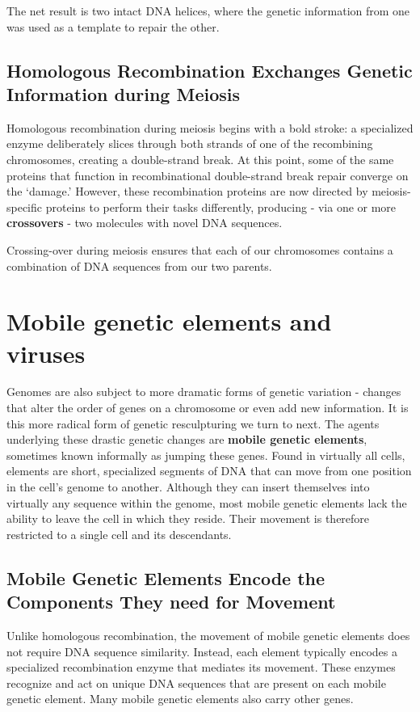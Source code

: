 The net result is two intact DNA
helices, where the genetic information from one was used as a template
to repair the other.

\subsection{Homologous Recombination Exchanges Genetic Information during Meiosis}

Homologous recombination during meiosis begins with a bold stroke:
a specialized enzyme deliberately slices through both strands of one
of the recombining chromosomes, creating a double-strand break. At
this point, some of the same proteins that function in recombinational
double-strand break repair converge on the ‘damage.’ However, these
recombination proteins are now directed by meiosis-specific proteins to
perform their tasks differently, producing - via one or more \textbf{crossovers} -
two molecules with novel DNA sequences.

Crossing-over during meiosis ensures that each of our chromosomes
contains a combination of DNA sequences from our two parents.

\section{Mobile genetic elements and viruses}

Genomes are also subject to more dramatic forms of genetic variation
- changes that alter the order of genes on a chromosome or even
add new information. It is this more radical form of genetic resculpturing
we turn to next. The agents underlying these drastic genetic changes
are \textbf{mobile genetic elements}, sometimes known informally as jumping these
genes. Found in virtually all cells,
elements are short, specialized
segments of DNA that can move from one position in the cell’s genome to
another. Although they can insert themselves into virtually any sequence
within the genome, most mobile genetic elements lack the ability to leave
the cell in which they reside. Their movement is therefore restricted to a
single cell and its descendants.

\subsection{Mobile Genetic Elements Encode the Components They need for Movement}

Unlike homologous recombination, the movement of mobile genetic elements
does not require DNA sequence similarity. Instead, each element
typically encodes a specialized recombination enzyme that mediates its
movement. These enzymes recognize and act on unique
DNA sequences that are present on each mobile genetic element. Many
mobile genetic elements also carry other genes.


